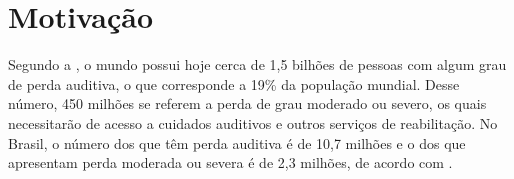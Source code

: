 \section{Motivação}
\label{sec:introducao-motivacao}


Segundo a , o mundo possui hoje cerca de 1,5 bilhões de pessoas com algum grau de perda auditiva, o que corresponde a 19\% da população mundial.
Desse número, 450 milhões se referem a perda de grau moderado ou severo, os quais necessitarão de acesso a cuidados auditivos e outros serviços de reabilitação.
No Brasil, o número dos que têm perda auditiva é de 10,7 milhões e o dos que apresentam perda moderada ou severa é de 2,3 milhões, de acordo com .







